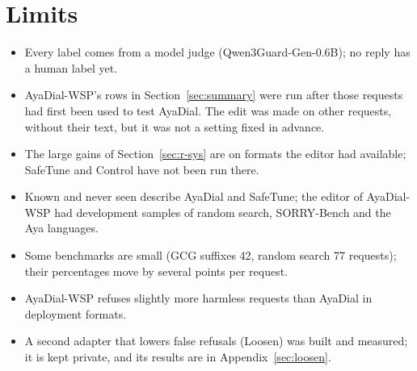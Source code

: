 \documentclass[10pt,a4paper]{article}
\begin{document}
\section{Limits}\label{sec:r-limits}
\begin{itemize}\setlength{\itemsep}{2pt}
\item Every label comes from a model judge (Qwen3Guard-Gen-0.6B); no reply has a human label yet.
\item AyaDial-WSP's rows in Section~\ref{sec:summary} were run after those requests had first been used to test AyaDial. The edit was made on other requests, without their text, but it was not a setting fixed in advance.
\item The large gains of Section~\ref{sec:r-sys} are on formats the editor had available; SafeTune and Control have not been run there.
\item Known and never seen describe AyaDial and SafeTune; the editor of AyaDial-WSP had development samples of random search, SORRY-Bench and the Aya languages.
\item Some benchmarks are small (GCG suffixes 42, random search 77 requests); their percentages move by several points per request.
\item AyaDial-WSP refuses slightly more harmless requests than AyaDial in deployment formats.
\item A second adapter that lowers false refusals (Loosen) was built and measured; it is kept private, and its results are in Appendix~\ref{sec:loosen}.
\end{itemize}
\clearpage\appendix
\end{document}
